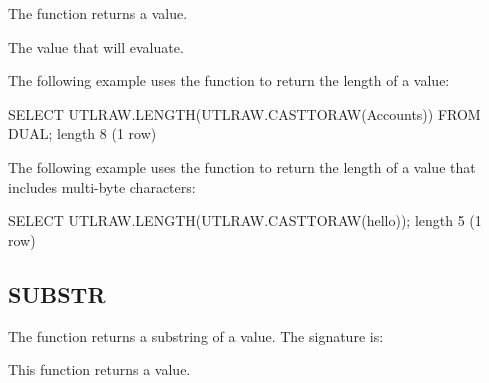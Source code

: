 \documentclass[letterpaper,10pt,english,openany,oneside]{sphinxmanual}
\begin{document}
The function returns a  value.



The  value that  will evaluate.


The following example uses the  function to return the length of a
 value:

%
\begin{sphinxVerbatim}[commandchars=\\\{\}]
SELECT UTL\PYGZus{}RAW.LENGTH(UTL\PYGZus{}RAW.CAST\PYGZus{}TO\PYGZus{}RAW(\PYGZsq{}Accounts\PYGZsq{})) FROM DUAL;
length
\PYGZhy{}\PYGZhy{}\PYGZhy{}\PYGZhy{}\PYGZhy{}\PYGZhy{}\PYGZhy{}\PYGZhy{}
8
(1 row)
\end{sphinxVerbatim}

The following example uses the  function to return the length of a  value that includes multi-byte characters:

%
\begin{sphinxVerbatim}[commandchars=\\\{\}]
SELECT UTL\PYGZus{}RAW.LENGTH(UTL\PYGZus{}RAW.CAST\PYGZus{}TO\PYGZus{}RAW(\PYGZsq{}hello\PYGZsq{}));
length
\PYGZhy{}\PYGZhy{}\PYGZhy{}\PYGZhy{}\PYGZhy{}\PYGZhy{}\PYGZhy{}\PYGZhy{}
     5
(1 row)
\end{sphinxVerbatim}

\newpage

\ignorespaces 

\subsection{SUBSTR}
\label{\detokenize{utl_raw:index-6}}\label{\detokenize{utl_raw:substr}}
The  function returns a substring of a  value. The signature
is:
\begin{quote}

\end{quote}

This function returns a  value.

\end{document}
